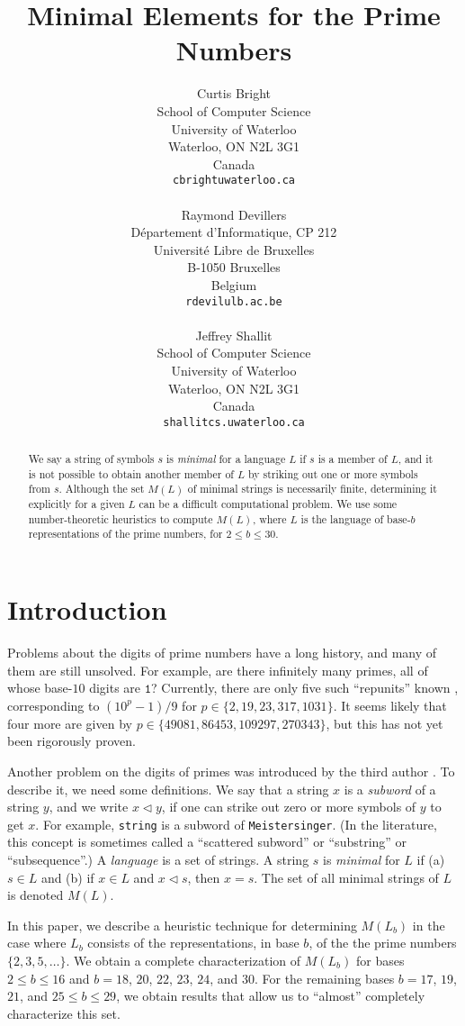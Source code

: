 \documentclass[12pt]{article}
\title{Minimal Elements for the Prime Numbers}
\author{Curtis Bright\\
School of Computer Science\\
University of Waterloo\\
Waterloo, ON  N2L 3G1\\
Canada\\
{\tt cbright\a uwaterloo.ca} \\
\ \\
Raymond Devillers\\
D\'epartement d'Informatique, CP 212\\
Universit\'e Libre de Bruxelles \\
B-1050 Bruxelles\\
Belgium\\
{\tt rdevil\a ulb.ac.be} \\
\ \\
Jeffrey Shallit \\
School of Computer Science\\
University of Waterloo\\
Waterloo, ON  N2L 3G1\\
Canada \\
{\tt shallit\a cs.uwaterloo.ca}}
\def\subw{\mathrel{\triangleleft}}
\theoremstyle{plain}
\theoremstyle{definition}
\newcommand{\0}{\mathtt{0}}
\newcommand{\1}{\mathtt{1}}
\newcommand{\2}{\mathtt{2}}
\newcommand{\3}{\mathtt{3}}
\newcommand{\4}{\mathtt{4}}
\newcommand{\5}{\mathtt{5}}
\newcommand{\6}{\mathtt{6}}
\newcommand{\7}{\mathtt{7}}
\newcommand{\8}{\mathtt{8}}
\newcommand{\9}{\mathtt{9}}
\newcommand{\updated}[1]{{\color{red}#1}}
\renewcommand{\updated}[1]{#1}
\begin{document}
\maketitle

\begin{abstract}
We say a string of symbols $s$ is \textit{minimal} for a language $L$
if $s$ is a member of $L$, and it is not possible to obtain another 
member of $L$ by striking out one or more symbols from $s$.  Although
the set $M(L)$ of minimal strings is necessarily finite, determining
it explicitly for a given $L$ can be a difficult computational problem.  
We use some number-theoretic heuristics to compute $M(L)$, where $L$
is the language of base-$b$ representations of the prime numbers,
for $2 \leq b \leq 30$.
\end{abstract}

\section{Introduction}

Problems about the digits of prime numbers have a long history, and many
of them are still unsolved.  For example, are there infinitely many
primes, all of whose base-$10$ digits are $\1$?  Currently,
there are only five such ``repunits''
known \cite{WD},
corresponding to $(10^p-1)/9$ for $p \in \{ 2, 19, 23, 317, 1031 \}$. 
It seems likely that four more are given by
$p \in \{ 49081, 86453, 109297, 270343\}$, but this has not yet been
rigorously proven.

Another problem on the digits of primes was introduced by the
third author \cite{Sh00}.  To describe it, we need some definitions.
We say that a string $x$ is a \textit{subword} of a string $y$, and 
we write $x \subw y$, if 
one can strike out zero or more symbols of $y$ to get $x$.
For example, {\tt string} is a subword of
{\tt Meistersinger}.  
(In the literature, this concept is sometimes called a ``scattered
subword'' or ``substring'' or ``subsequence''.)
A \textit{language} is a set of strings.  A string $s$ is \textit{minimal}
for $L$ if  (a) $s \in L$ and (b) if $x \in L$ and $x \subw s$, then
$x = s$.    The set of all minimal strings of $L$ is denoted $M(L)$.

In this paper, we describe a heuristic
technique for determining $M(L_b)$ in the
case where $L_b$ consists of the representations, in base $b$, of the
the prime numbers $\lbrace 2, 3, 5, \dotsc \rbrace$.  We obtain
a complete characterization of $M(L_b)$ for bases
$2 \leq b \leq 16$ and \updated{$b = 18$, $20$, $22$, $23$, $24$, and $30$.   For the remaining
bases $b = 17$, $19$, $21$, and $25\leq b\leq 29$,}
we obtain results that allow us to ``almost'' completely characterize this set.
\end{document}
